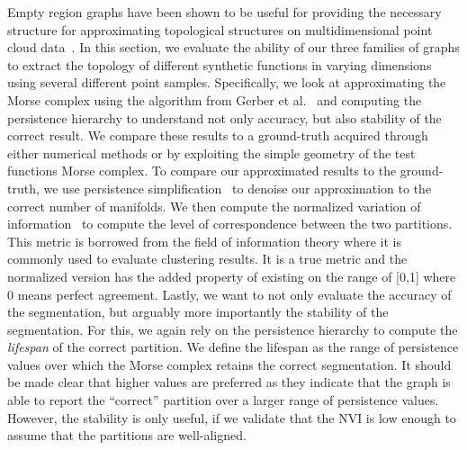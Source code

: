 Empty region graphs have been shown to be useful for providing the necessary structure for approximating topological structures on multidimensional point cloud data~\cite{BremerMaljovecSaha2014,CorreaLindstrom2011,LiebmannWeberScheuermann2018,MaljovecLiuWang2016,MaljovecWangRosen2016}.
%
In this section, we evaluate the ability of our three families of graphs to extract the topology of different synthetic functions in varying dimensions using several different point samples.
%
Specifically, we look at approximating the Morse complex using the algorithm from Gerber et al.~\cite{GerberBremerPascucci2010} and computing the persistence hierarchy to understand not only accuracy, but also stability of the correct result.
%
We compare these results to a ground-truth acquired through either numerical methods or by exploiting the simple geometry of the test functions Morse complex.
%
To compare our approximated results to the ground-truth, we use persistence simplification~\cite{EdelsbrunnerLetscherZomorodian2002,EdelsbrunnerHarer2008} to denoise our approximation to the correct number of manifolds.
%
We then compute the normalized variation of information~\cite{VinhEppsBailey2010} to compute the level of correspondence between the two partitions.
%
This metric is borrowed from the field of information theory where it is commonly used to evaluate clustering results.
%
It is a true metric and the normalized version has the added property of existing on the range of [0,1] where 0 means perfect agreement.
%
Lastly, we want to not only evaluate the accuracy of the segmentation, but arguably more importantly the stability of the segmentation.
%
For this, we again rely on the persistence hierarchy to compute the \textit{lifespan} of the correct partition.
%
We define the lifespan as the range of persistence values over which the Morse complex retains the correct segmentation.
%
It should be made clear that higher values are preferred as they indicate that the graph is able to report the ``correct'' partition over a larger range of persistence values.
%
However, the stability is only useful, if we validate that the NVI is low enough to assume that the partitions are well-aligned.

